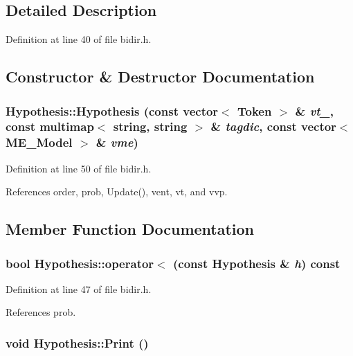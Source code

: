 \subsection{Detailed Description}


Definition at line 40 of file bidir.h.

\subsection{Constructor \& Destructor Documentation}
\hypertarget{structHypothesis_83ba05ec1c34ffa81137fcefaad9054c}{
\subsubsection[{Hypothesis}]{\setlength{\rightskip}{0pt plus 5cm}Hypothesis::Hypothesis (const {\bf vector}$<$ {\bf Token} $>$ \& {\em vt\_\-}, \/  const multimap$<$ string, string $>$ \& {\em tagdic}, \/  const {\bf vector}$<$ {\bf ME\_\-Model} $>$ \& {\em vme})}}
\label{structHypothesis_83ba05ec1c34ffa81137fcefaad9054c}




Definition at line 50 of file bidir.h.

References order, prob, Update(), vent, vt, and vvp.

\subsection{Member Function Documentation}
\hypertarget{structHypothesis_8ddf211bd1d982dcf7256bb8b87b46f4}{
\subsubsection[{operator$<$}]{\setlength{\rightskip}{0pt plus 5cm}bool Hypothesis::operator$<$ (const {\bf Hypothesis} \& {\em h}) const}}
\label{structHypothesis_8ddf211bd1d982dcf7256bb8b87b46f4}




Definition at line 47 of file bidir.h.

References prob.\hypertarget{structHypothesis_8b727811ecdc043196ccb2443f0926fd}{
\subsubsection[{Print}]{\setlength{\rightskip}{0pt plus 5cm}void Hypothesis::Print ()}}
\label{structHypothesis_8b727811ecdc043196ccb2443f0926fd}




